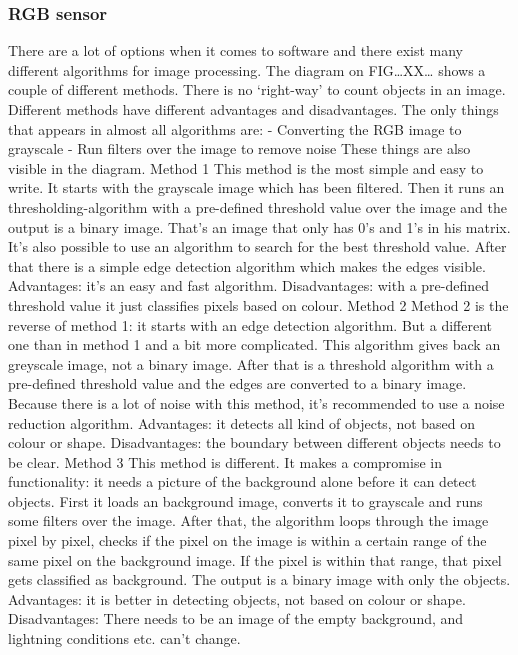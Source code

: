 \documentclass{article}
\begin{document}
\subsubsection{RGB sensor}

There are a lot of options when it comes to software and there exist many different algorithms for image processing. The diagram on FIG…XX… shows a couple of different methods. There is no ‘right-way’ to count objects in an image. Different methods have different advantages and disadvantages. The only things that appears in almost all algorithms are:
-	Converting the RGB image to grayscale
-	Run filters over the image to remove noise
These things are also visible in the diagram.
Method 1
This method is the most simple and easy to write. It starts with the grayscale image which has been filtered. Then it runs an thresholding-algorithm with a pre-defined threshold value over the image and the output is a binary image. That’s an image that only has 0’s and 1’s in his matrix.  It’s also possible to use an algorithm to search for the best threshold value.  After that there is a simple edge detection algorithm which makes the edges visible. 
Advantages: it’s an easy and fast algorithm.
Disadvantages: with a pre-defined threshold value it just classifies pixels based on colour. 
Method 2
Method 2 is the reverse of method 1: it starts with an edge detection algorithm. But a different one than in method 1 and a bit more complicated. This algorithm gives back an greyscale image, not a binary image. After that is a threshold algorithm with a pre-defined threshold value and the edges are converted to a binary image. Because there is a lot of noise with this method, it's recommended to use a noise reduction algorithm. 
Advantages: it detects all kind of objects, not based on colour or shape.
Disadvantages: the boundary between different objects needs to be clear.
Method 3
This method is different. It makes a compromise in functionality: it needs a picture of the background alone before it can detect objects. First it loads an background image, converts it to grayscale and runs some filters over the image. After that, the algorithm loops through the image pixel by pixel, checks if the pixel on the image is within a certain range of the same pixel on the background image. If the pixel is within that range, that pixel gets classified as background. The output is a binary image with only the objects.  
Advantages: it is better in detecting objects, not based on colour or shape.
Disadvantages: There needs to be an image of the empty background, and lightning conditions etc. can’t change.
\end{document}

